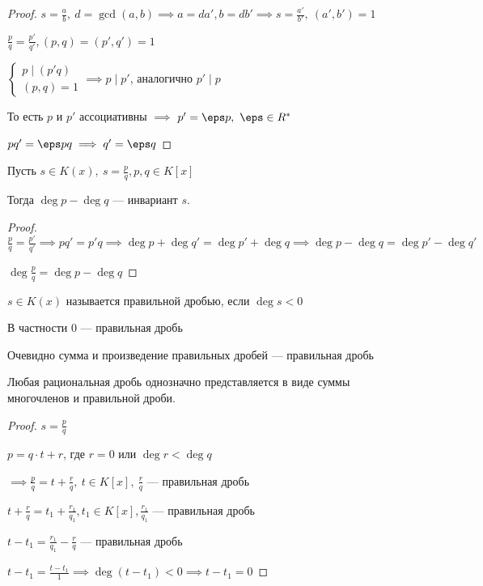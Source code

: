 \begin{proof}
    $s = \frac{a}{b},~ d = \gcd(a, b) \implies a = d a', b = d b' \implies s = \frac{a'}{b'},~ (a', b') = 1$

    $\frac{p}{q} = \frac{p'}{q'}, (p, q) = (p', q') = 1$

    $\begin{cases}
        p \mid (p'q)\\
        (p, q) = 1
    \end{cases} \implies p \mid p'$, аналогично $p' \mid p$

    То есть $p$ и $p'$ ассоциативны $\implies$ $p' = \eps p,~ \eps \in R^*$

    $pq' = \eps p q \implies q' = \eps q$
\end{proof}

\begin{lemma}
    Пусть $s \in K(x),~s = \frac{p}{q}, p, q \in K[x]$

    Тогда $\deg p - \deg q$ --- инвариант $s$.
\end{lemma}

\begin{proof}
    $\frac{p}{q} = \frac{p'}{q'} \implies pq' = p'q \implies \deg p + \deg q' = \deg p' + \deg q \implies \deg p - \deg q = \deg p' - \deg q'$

    $\deg \frac{p}{q} = \deg p - \deg q$
\end{proof}

\begin{defn}
    $s \in K(x)$ называется правильной дробью, если $\deg s < 0$

    В частности $0$ --- правильная дробь
\end{defn}

\begin{notice}
    Очевидно сумма и произведение правильных дробей --- правильная дробь
\end{notice}

\begin{lemma}
    Любая рациональная дробь однозначно представляется в виде суммы многочленов и правильной дроби.
\end{lemma}

\begin{proof}
    $s = \frac{p}{q}$

    $p = q \cdot t + r$, где $r = 0$ или $\deg r < \deg q$

    $\implies \frac{p}{q} = t + \frac{r}{q},~t \in K[x],~\frac{r}{q}$ --- правильная дробь

    $t + \frac{r}{q} = t_1 + \frac{r_1}{q_1}, t_1 \in K[x], \frac{r_1}{q_1}$ --- правильная дробь

    $t - t_1 = \frac{r_1}{q_1} - \frac{r}{q}$ --- правильная дробь

    $t - t_1 = \frac{t - t_1}{1} \implies \deg(t - t_1) < 0 \implies  t - t_1 = 0$
\end{proof}

